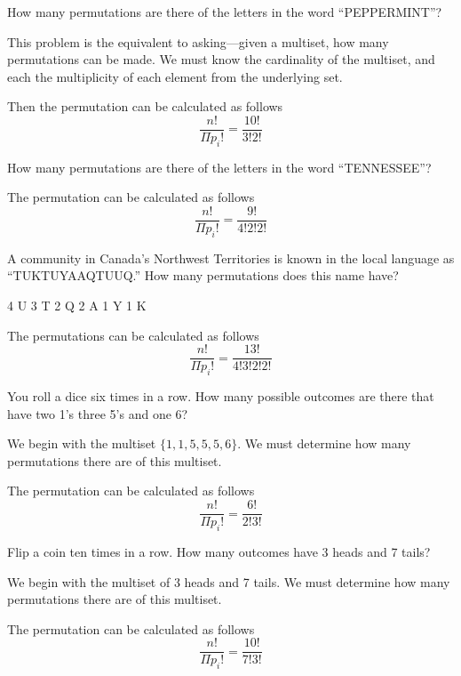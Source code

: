\documentclass[openany, 12pt]{book}
\begin{document}
\begin{exercise}{}{}
	How many permutations are there of the letters in the word ``PEPPERMINT''?
	\begin{alist}
		\item This problem is the equivalent to asking---given a multiset, how many
		permutations can be made.  We must know the cardinality of the multiset, and each
		the multiplicity of each element from the underlying set.
		\item Then the permutation can be calculated as follows
		$$ \dfrac{n!}{\Pi{p_i}!} = \dfrac{10!}{3!2!}$$
	\end{alist}
\end{exercise}

\begin{exercise}{}{}
	How many permutations are there of the letters in the word ``TENNESSEE''?
	\begin{alist}
		\item The permutation can be calculated as follows $$
			\dfrac{n!}{\Pi{p_i}!} = \dfrac{9!}{4!2!2!}$$
	\end{alist}
\end{exercise}

\begin{exercise}{}{}
	A community in Canada's Northwest Territories is known in the local language
	as ``TUKTUYAAQTUUQ.'' How many permutations does this name have?
	\begin{alist}
		\item
		4 U
		3 T
		2 Q
		2 A
		1 Y
		1 K
		\item The permutations can be calculated as follows $$
			\dfrac{n!}{\Pi{p_i}!} = \dfrac{13!}{4!3!2!2!}$$
	\end{alist}
\end{exercise}

\begin{exercise}{}{}
	You roll a dice six times in a row. How many possible outcomes are there
	that have two 1's three 5's and one 6?
	\begin{alist}
		\item We begin with the multiset $\{1, 1, 5, 5, 5, 6\}$. We must determine how
		many permutations there are of this multiset.
		\item The permutation can be calculated as follows
		$$ \dfrac{n!}{\Pi{p_i}!} = \dfrac{6!}{2!3!}$$
	\end{alist}
\end{exercise}

\begin{exercise}{}{}
	Flip a coin ten times in a row. How many outcomes have 3 heads and 7 tails?
	\begin{alist}
		\item We begin with the multiset of 3 heads and 7 tails. We must determine how
		many permutations there are of this multiset.
		\item The permutation can be calculated as follows
		$$ \dfrac{n!}{\Pi{p_i}!} = \dfrac{10!}{7!3!}$$
	\end{alist}
\end{exercise}
\end{document}
